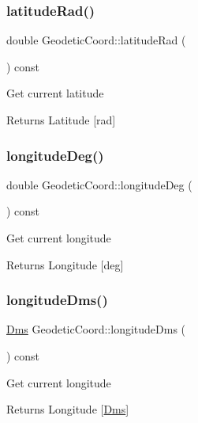 \subsubsection{\texorpdfstring{latitude\+Rad()}{latitudeRad()}}
{\footnotesize\ttfamily double Geodetic\+Coord\+::latitude\+Rad (\begin{DoxyParamCaption}{ }\end{DoxyParamCaption}) const}

Get current latitude \begin{DoxyReturn}{Returns}
Latitude \mbox{[}rad\mbox{]} 
\end{DoxyReturn}
\mbox{\label{class_m210_1_1_geodetic_coord_a015d828931c1e3bb05de39bdbe415af9}} 
\subsubsection{\texorpdfstring{longitude\+Deg()}{longitudeDeg()}}
{\footnotesize\ttfamily double Geodetic\+Coord\+::longitude\+Deg (\begin{DoxyParamCaption}{ }\end{DoxyParamCaption}) const}

Get current longitude \begin{DoxyReturn}{Returns}
Longitude \mbox{[}deg\mbox{]} 
\end{DoxyReturn}
\mbox{\label{class_m210_1_1_geodetic_coord_aed72a7b5422dbcdfe84a3168364cc4c0}} 
\subsubsection{\texorpdfstring{longitude\+Dms()}{longitudeDms()}}
{\footnotesize\ttfamily \mbox{\hyperlink{struct_m210_1_1_dms}{Dms}} Geodetic\+Coord\+::longitude\+Dms (\begin{DoxyParamCaption}{ }\end{DoxyParamCaption}) const}

Get current longitude \begin{DoxyReturn}{Returns}
Longitude \mbox{[}\mbox{\hyperlink{struct_m210_1_1_dms}{Dms}}\mbox{]} 
\end{DoxyReturn}
\mbox{\label{class_m210_1_1_geodetic_coord_a8ba9a63a7d067d52c9745ce6d20c7ec8}} 
